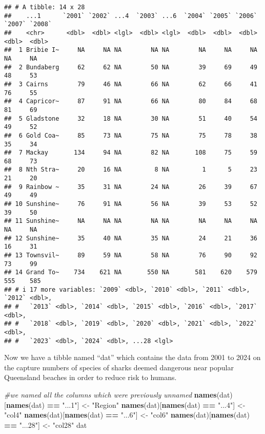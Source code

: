 \documentclass[
]{article}
\newenvironment{Shaded}{\begin{snugshade}}{\end{snugshade}}
\newcommand{\CommentTok}[1]{\textcolor[rgb]{0.56,0.35,0.01}{\textit{#1}}}
\newcommand{\FunctionTok}[1]{\textcolor[rgb]{0.13,0.29,0.53}{\textbf{#1}}}
\newcommand{\NormalTok}[1]{#1}
\newcommand{\OtherTok}[1]{\textcolor[rgb]{0.56,0.35,0.01}{#1}}
\newcommand{\SpecialCharTok}[1]{\textcolor[rgb]{0.81,0.36,0.00}{\textbf{#1}}}
\newcommand{\StringTok}[1]{\textcolor[rgb]{0.31,0.60,0.02}{#1}}
\begin{document}
\begin{verbatim}
## # A tibble: 14 x 28
##    ...1      `2001` `2002` ...4  `2003` ...6  `2004` `2005` `2006` `2007` `2008`
##    <chr>      <dbl>  <dbl> <lgl>  <dbl> <lgl>  <dbl>  <dbl>  <dbl>  <dbl>  <dbl>
##  1 Bribie I~     NA     NA NA        NA NA        NA     NA     NA     NA     NA
##  2 Bundaberg     62     62 NA        50 NA        39     69     49     48     53
##  3 Cairns        79     46 NA        66 NA        62     66     41     76     55
##  4 Capricor~     87     91 NA        66 NA        80     84     68     81     69
##  5 Gladstone     32     18 NA        30 NA        51     40     54     49     52
##  6 Gold Coa~     85     73 NA        75 NA        75     78     38     35     34
##  7 Mackay       134     94 NA        82 NA       108     75     59     68     73
##  8 Nth Stra~     20     16 NA         8 NA         1      5     23     21     20
##  9 Rainbow ~     35     31 NA        24 NA        26     39     67     49     49
## 10 Sunshine~     76     91 NA        56 NA        39     53     52     39     50
## 11 Sunshine~     NA     NA NA        NA NA        NA     NA     NA     NA     NA
## 12 Sunshine~     35     40 NA        35 NA        24     21     36     16     31
## 13 Townsvil~     89     59 NA        58 NA        76     90     92     73     99
## 14 Grand To~    734    621 NA       550 NA       581    620    579    555    585
## # i 17 more variables: `2009` <dbl>, `2010` <dbl>, `2011` <dbl>, `2012` <dbl>,
## #   `2013` <dbl>, `2014` <dbl>, `2015` <dbl>, `2016` <dbl>, `2017` <dbl>,
## #   `2018` <dbl>, `2019` <dbl>, `2020` <dbl>, `2021` <dbl>, `2022` <dbl>,
## #   `2023` <dbl>, `2024` <dbl>, ...28 <lgl>
\end{verbatim}

Now we have a tibble named ``dat'' which contains the data from 2001 to
2024 on the capture numbers of species of sharks deemed dangerous near
popular Queensland beaches in order to reduce risk to humans.

\begin{Shaded}
\begin{Highlighting}[]
\CommentTok{\#we named all the columns which were previously unnamed}
\FunctionTok{names}\NormalTok{(dat)[}\FunctionTok{names}\NormalTok{(dat) }\SpecialCharTok{==} \StringTok{"...1"}\NormalTok{] }\OtherTok{\textless{}{-}} \StringTok{"Region"}
\FunctionTok{names}\NormalTok{(dat)[}\FunctionTok{names}\NormalTok{(dat) }\SpecialCharTok{==} \StringTok{"...4"}\NormalTok{] }\OtherTok{\textless{}{-}} \StringTok{"col4"}
\FunctionTok{names}\NormalTok{(dat)[}\FunctionTok{names}\NormalTok{(dat) }\SpecialCharTok{==} \StringTok{"...6"}\NormalTok{] }\OtherTok{\textless{}{-}} \StringTok{"col6"}
\FunctionTok{names}\NormalTok{(dat)[}\FunctionTok{names}\NormalTok{(dat) }\SpecialCharTok{==} \StringTok{"...28"}\NormalTok{] }\OtherTok{\textless{}{-}} \StringTok{"col28"}
\NormalTok{dat}
\end{Highlighting}
\end{Shaded}
\end{document}
